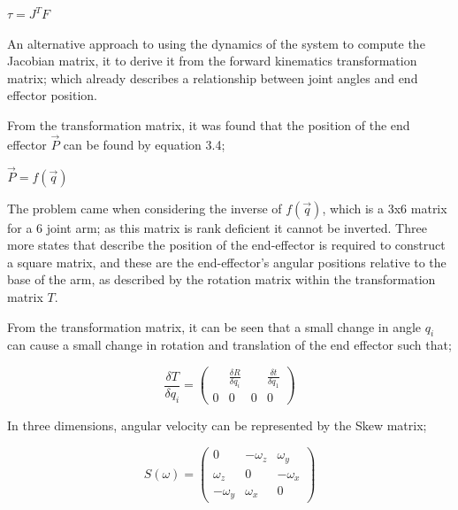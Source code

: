 \documentclass[12pt,openany,a4paper]{book}
\begin{document}
\vspace{\baselineskip}
\begin{center}
$\tau = J^T F$
\end{center}

\vspace{\baselineskip}
An alternative approach to using the dynamics of the system to compute the Jacobian matrix, it to derive it from the forward kinematics transformation matrix; which already describes a relationship between joint angles and end effector position. 

From the transformation matrix, it was found that the position of the end effector $\vec{P}$ can be found by equation 3.4;

\vspace{\baselineskip}
\begin{center}
$\vec{P} = f( \vec{q} )$
\end{center}

\vspace{\baselineskip}
The problem came when considering the inverse of $f(\vec{q})$, which is a 3x6 matrix for a 6 joint arm; as this matrix is rank deficient it cannot be inverted. Three more states that describe the position of the end-effector is required to construct a square matrix, and these are the end-effector's angular positions relative to the base of the arm, as described by the rotation matrix within the transformation matrix $T$.

From the transformation matrix, it can be seen that a small change in angle $q_i$ can cause a small change in rotation and translation of the end effector such that;

\vspace{\baselineskip}
\begin{equation}
\frac{\delta T}{\delta q_i} = 
\left(\begin{array}{cccc} & \frac{\delta R}{\delta q_i} & & \frac{\delta t}{\delta q_1}  \\ 0 & 0 & 0 & 0 \end{array}\right)
\end{equation}

\vspace{\baselineskip}
In three dimensions, angular velocity can be represented by the Skew matrix;

\vspace{\baselineskip}
\begin{equation}
S(\omega) = 
 \left(\begin{array}{ccc} 0 & -\omega_z & \omega_y \\ \omega_z & 0 & -\omega_x  \\ -\omega_y & \omega_x & 0 \end{array}\right)
\end{equation}
\end{document}
